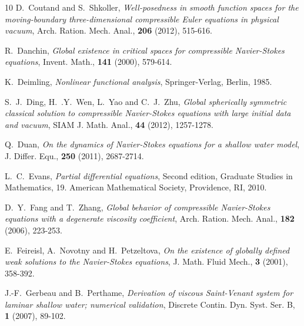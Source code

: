 \documentclass[11pt, reqno]{amsart}
\numberwithin{equation}{section}
\begin{document}
{\begin{thebibliography}{10}
{\sc  D.~Coutand and S.~Shkoller}, {\em Well-posedness in smooth function spaces for the moving-boundary three-dimensional compressible Euler equations in physical vacuum}, Arch. Ration. Mech. Anal., {\bf 206} (2012), 515-616.


{\sc R.~Danchin},  {\em Global existence in critical spaces for compressible Navier-Stokes equations}, Invent. Math., {\bf 141} (2000), 579-614.


{\sc K.~Deimling}, {\em Nonlinear functional analysis}, Springer-Verlag, Berlin, 1985.



{\sc S.~J.~Ding, H.~.Y.~Wen, L.~Yao and C.~J.~Zhu}, {\em Global spherically symmetric classical solution to compressible Navier-Stokes equations with large initial data and vacuum}, SIAM J. Math. Anal., {\bf 44} (2012), 1257-1278.

{\sc  Q.~Duan}, {\em On the dynamics of Navier-Stokes equations for a shallow water model}, J. Differ. Equ., {\bf 250} (2011), 2687-2714.



{\sc  L.~C.~Evans}, {\em Partial differential equations}, Second edition, Graduate Studies in Mathematics, 19. American Mathematical Society, Providence, RI, 2010.




{\sc  D.~Y.~Fang and T.~Zhang}, {\em Global behavior of compressible Navier-Stokes equations with a degenerate viscosity coefficient}, Arch. Ration. Mech. Anal., {\bf 182} (2006),  223-253.

{\sc E.~Feireisl, A.~Novotny and H.~Petzeltova}, {\em On the existence of globally defined weak solutions to the Navier-Stokes equations}, J. Math. Fluid Mech., {\bf 3} (2001), 358-392.

{\sc J.-F.~Gerbeau and B.~Perthame}, {\em Derivation of viscous Saint-Venant system for laminar shallow water; numerical validation}, Discrete Contin. Dyn. Syst. Ser. B, {\bf 1} (2007), 89-102.


\end{thebibliography}}
\end{document}

